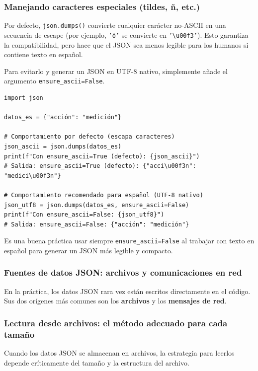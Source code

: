 \begin{note}
\subsubsection*{Manejando caracteres especiales (tildes, ñ, etc.)}
Por defecto, \texttt{json.dumps()} convierte cualquier carácter no-ASCII en una secuencia de escape (por ejemplo, \texttt{'ó'} se convierte en \texttt{'\textbackslash u00f3'}). Esto garantiza la compatibilidad, pero hace que el JSON sea menos legible para los humanos si contiene texto en español.

Para evitarlo y generar un JSON en UTF-8 nativo, simplemente añade el argumento \texttt{ensure\_ascii=False}.

\begin{lstlisting}[style=PythonStyle, caption={Comparativa del manejo de caracteres especiales.}]
import json

datos_es = {"acción": "medición"}

# Comportamiento por defecto (escapa caracteres)
json_ascii = json.dumps(datos_es)
print(f"Con ensure_ascii=True (defecto): {json_ascii}")
# Salida: ensure_ascii=True (defecto): {"acci\u00f3n": "medici\u00f3n"}

# Comportamiento recomendado para español (UTF-8 nativo)
json_utf8 = json.dumps(datos_es, ensure_ascii=False)
print(f"Con ensure_ascii=False: {json_utf8}")
# Salida: ensure_ascii=False: {"acción": "medición"}
\end{lstlisting}
Es una buena práctica usar siempre \texttt{ensure\_ascii=False} al trabajar con texto en español para generar un JSON más legible y compacto.
\end{note}

\newpage
\subsubsection{Fuentes de datos JSON: archivos y comunicaciones en red}

En la práctica, los datos JSON rara vez están escritos directamente en el código. Sus dos orígenes más comunes son los \textbf{archivos} y los \textbf{mensajes de red}.

\subsubsection*{Lectura desde archivos: el método adecuado para cada tamaño}

Cuando los datos JSON se almacenan en archivos, la estrategia para leerlos depende críticamente del tamaño y la estructura del archivo.

